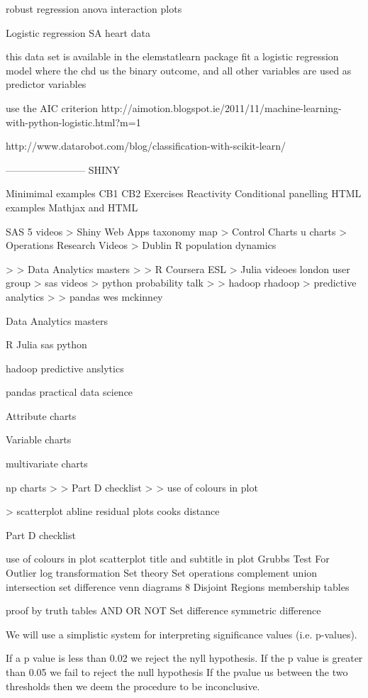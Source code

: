 robust regression
 anova
 interaction plots

Logistic regression
 SA heart data
 
this data set is available in the elemstatlearn package
 fit a logistic regression model where the chd us the binary outcome, and all other variables are used as predictor variables
 
use the AIC criterion 
http://aimotion.blogspot.ie/2011/11/machine-learning-with-python-logistic.html?m=1
 
http://www.datarobot.com/blog/classification-with-scikit-learn/


------------------------
SHINY

Minimimal examples CB1 CB2
 Exercises
 Reactivity
 Conditional panelling
 HTML examples
 Mathjax and HTML


SAS 5 videos
 > Shiny Web Apps taxonomy map
 > Control Charts u charts
 > Operations Research Videos
 > Dublin R population dynamics

>
 > Data Analytics masters
 >
 > R Coursera ESL
 > Julia videoes london user group
 > sas videos
 > python probability talk
 >
 > hadoop rhadoop
 > predictive analytics
 >
 > pandas wes mckinney


Data Analytics masters
 
R 
Julia
 sas
 python
 
hadoop
 predictive anslytics
 
pandas
 practical data science


Attribute charts
 
Variable charts
 
multivariate charts
 
np charts
>
 > Part D checklist
 >
 > use of colours in plot

 > scatterplot abline
 residual plots
 cooks distance

Part D checklist
 
use of colours in plot
 scatterplot
 title and subtitle in plot
 Grubbs Test For Outlier
 log transformation
Set theory
 Set operations
 complement
 union intersection
 set difference
 venn diagrams
 8 Disjoint Regions
 membership tables
 
proof by truth tables
 AND
 OR
 NOT
 Set difference
 symmetric difference


We will use a simplistic system for interpreting significance values (i.e. p-values).
 
If a p value is less than 0.02 we reject the nyll hypothesis.
 If the p value is greater than 0.05 we fail to reject the null hypothesis
 If the pvalue us between the two thresholds then we deem the procedure to be inconclusive. 

